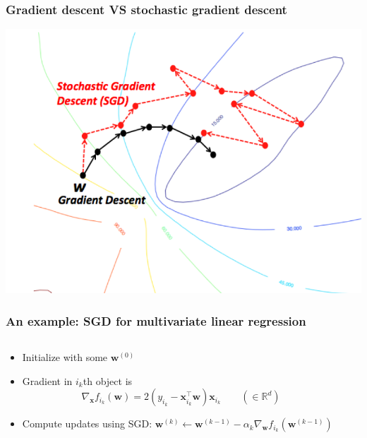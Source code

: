 \documentclass[usenames,dvipsnames,aspectratio=169]{beamer}
\begin{document}
\begin{frame}
\frametitle{Gradient descent VS stochastic gradient descent}

\begin{center}
  \includegraphics[width=0.7\columnwidth]
    {stochastic-vs-batch-gradient-descent.png}
\end{center}


\end{frame}



\begin{frame}
\frametitle{An example: SGD for multivariate linear regression}

\begin{columns}
\begin{column}{0.5\textwidth}

\begin{itemize}

\item Initialize with some $\mathbf{w}^{(0)}$

\item Gradient in $i_k$th object is
\[
\nabla_{\mathbf{x}} f_{i_k}(\mathbf{w}) = 
2 (y_{i_k} - \mathbf{x}_{i_k}^{\intercal}\mathbf{w})\mathbf{x}_{i_k}
\qquad (\in \mathbb{R}^d)
\]

\item Compute updates using SGD: 
$\mathbf{w}^{(k)} \leftarrow
\mathbf{w}^{(k-1)} - \alpha_k
  \nabla_{\mathbf{w}} f_{i_k}(\mathbf{w}^{(k-1)})$

\end{itemize}

\end{column}
\begin{column}{0.5\textwidth}  %

\begin{center}
\end{center}

\end{column}
\end{columns}

\end{frame}
\end{document}
